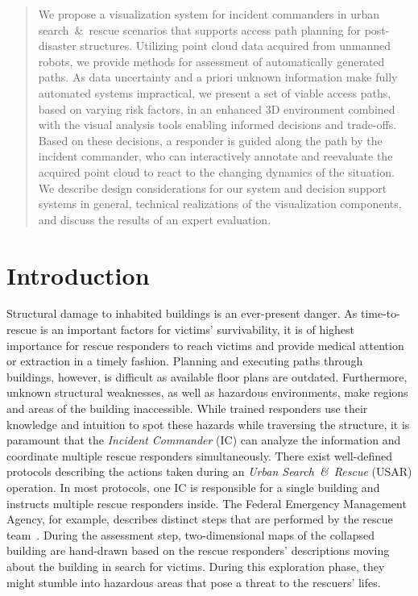 \documentclass{egpubl}
\begin{document}
\begin{abstract}
We propose a visualization system for incident commanders in urban search~\&~rescue scenarios that supports access path planning for post-disaster structures. Utilizing point cloud data acquired from unmanned robots, we provide methods for assessment of automatically generated paths. As data uncertainty and a priori unknown information make fully automated systems impractical, we present a set of viable access paths, based on varying risk factors, in an enhanced 3D environment combined with the visual analysis tools enabling informed decisions and trade-offs. Based on these decisions, a responder is guided along the path by the incident commander, who can interactively annotate and reevaluate the acquired point cloud to react to the changing dynamics of the situation. We describe design considerations for our system and decision support systems in general, technical realizations of the visualization components, and discuss the results of an expert evaluation.

\begin{classification}
\end{classification}

\end{abstract}

\section{Introduction}
Structural damage to inhabited buildings is an ever-present danger. As time-to-rescue is an important factors for victims' survivability, it is of highest importance for rescue responders to reach victims and provide medical attention or extraction in a timely fashion. Planning and executing paths through buildings, however, is difficult as available floor plans are outdated. Furthermore, unknown structural weaknesses, as well as hazardous environments, make regions and areas of the building inaccessible. While trained responders use their knowledge and intuition to spot these hazards while traversing the structure, it is paramount that the \emph{Incident Commander} (IC) can analyze the information and coordinate multiple rescue responders simultaneously. There exist well-defined protocols describing the actions taken during an \emph{Urban Search~\&~Rescue} (USAR) operation. In most protocols, one IC is responsible for a single building and instructs multiple rescue responders inside. The Federal Emergency Management Agency, for example, describes distinct steps that are performed by the rescue team~\cite{fema08}. During the assessment step, two-dimensional maps of the collapsed building are hand-drawn based on the rescue responders' descriptions moving about the building in search for victims. During this exploration phase, they might stumble into hazardous areas that pose a threat to the rescuers' lifes.
\end{document}
